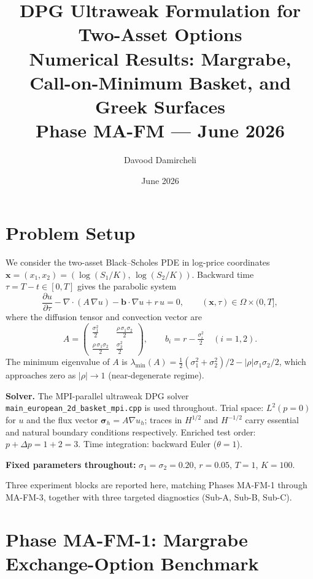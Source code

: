 \documentclass[11pt,a4paper]{article}
\title{\textbf{DPG Ultraweak Formulation for Two-Asset Options}\\[4pt]
       \large Numerical Results: Margrabe, Call-on-Minimum Basket,
               and Greek Surfaces\\[2pt]
       \normalsize Phase MA-FM --- June 2026}
\author{Davood Damircheli}
\date{June 2026}
\begin{document}
\maketitle
\tableofcontents
\bigskip

\section{Problem Setup}
\label{sec:setup}

We consider the two-asset Black--Scholes PDE in log-price coordinates
$\mathbf{x} = (x_1,x_2) = (\log(S_1/K),\,\log(S_2/K))$.
Backward time $\tau = T - t \in [0,T]$ gives the parabolic system
\[
  \frac{\partial u}{\partial \tau}
  - \nabla\cdot(A\,\nabla u)
  - \mathbf{b}\cdot\nabla u
  + r\,u = 0,
  \qquad (\mathbf{x},\tau)\in\Omega\times(0,T],
\]
where the diffusion tensor and convection vector are
\[
  A =
  \begin{pmatrix}
    \tfrac{\sigma_1^2}{2} & \tfrac{\rho\,\sigma_1\sigma_2}{2} \\[4pt]
    \tfrac{\rho\,\sigma_1\sigma_2}{2} & \tfrac{\sigma_2^2}{2}
  \end{pmatrix},
  \qquad
  b_i = r - \tfrac{\sigma_i^2}{2} \quad (i=1,2).
\]
The minimum eigenvalue of $A$ is
$\lambda_{\min}(A) = \tfrac{1}{2}(\sigma_1^2 + \sigma_2^2)/2 - |\rho|\sigma_1\sigma_2/2$,
which approaches zero as $|\rho|\to 1$ (near-degenerate regime).

\textbf{Solver.}
The MPI-parallel ultraweak DPG solver
\texttt{main\_european\_2d\_basket\_mpi.cpp} is used throughout.
Trial space: $L^2(p{=}0)$ for $u$ and the flux vector $\boldsymbol\sigma_h = A\nabla u_h$;
traces in $H^{1/2}$ and $H^{-1/2}$ carry essential and natural boundary
conditions respectively.
Enriched test order: $p + \Delta p = 1 + 2 = 3$.
Time integration: backward Euler ($\theta=1$).

\textbf{Fixed parameters throughout:}
$\sigma_1 = \sigma_2 = 0.20$, $r = 0.05$, $T = 1$, $K = 100$.

Three experiment blocks are reported here, matching Phases MA-FM-1 through
MA-FM-3, together with three targeted diagnostics (Sub-A, Sub-B, Sub-C).

\section{Phase MA-FM-1: Margrabe Exchange-Option Benchmark}
\label{sec:margrabe}
\end{document}
